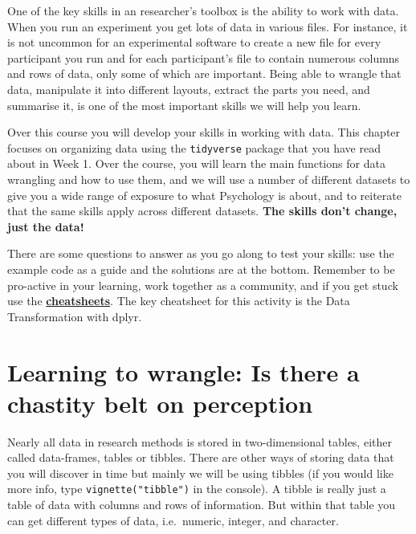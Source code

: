 \documentclass[]{book}
\begin{document}
One of the key skills in an researcher's toolbox is the ability to work with data. When you run an experiment you get lots of data in various files. For instance, it is not uncommon for an experimental software to create a new file for every participant you run and for each participant's file to contain numerous columns and rows of data, only some of which are important. Being able to wrangle that data, manipulate it into different layouts, extract the parts you need, and summarise it, is one of the most important skills we will help you learn.

Over this course you will develop your skills in working with data. This chapter focuses on organizing data using the \texttt{tidyverse} package that you have read about in Week 1. Over the course, you will learn the main functions for data wrangling and how to use them, and we will use a number of different datasets to give you a wide range of exposure to what Psychology is about, and to reiterate that the same skills apply across different datasets. \textbf{The skills don't change, just the data!}

There are some questions to answer as you go along to test your skills: use the example code as a guide and the solutions are at the bottom. Remember to be pro-active in your learning, work together as a community, and if you get stuck use the \textbf{\href{https://www.rstudio.com/resources/cheatsheets/}{cheatsheets}}. The key cheatsheet for this activity is the Data Transformation with dplyr.

\hypertarget{learning-to-wrangle-is-there-a-chastity-belt-on-perception}{%
\section{Learning to wrangle: Is there a chastity belt on perception}\label{learning-to-wrangle-is-there-a-chastity-belt-on-perception}}

Nearly all data in research methods is stored in two-dimensional tables, either called data-frames, tables or tibbles. There are other ways of storing data that you will discover in time but mainly we will be using tibbles (if you would like more info, type \texttt{vignette("tibble")} in the console). A tibble is really just a table of data with columns and rows of information. But within that table you can get different types of data, i.e.~numeric, integer, and character.
\end{document}
